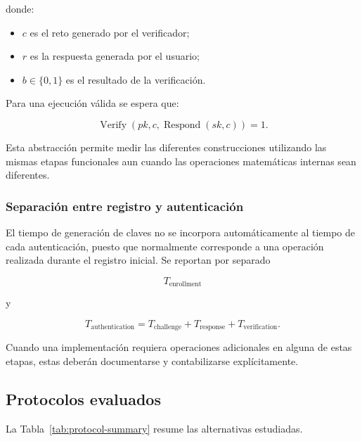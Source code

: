 donde:

\begin{itemize}
    \item $c$ es el reto generado por el verificador;
    \item $r$ es la respuesta generada por el usuario;
    \item $b \in \{0,1\}$ es el resultado de la verificación.
\end{itemize}

Para una ejecución válida se espera que:

\begin{equation}
    \operatorname{Verify}(pk,c,
    \operatorname{Respond}(sk,c)) = 1.
\end{equation}

Esta abstracción permite medir las diferentes construcciones utilizando las mismas
etapas funcionales aun cuando las operaciones matemáticas internas sean diferentes.

\subsubsection{Separación entre registro y autenticación}

El tiempo de generación de claves no se incorpora automáticamente al tiempo de cada
autenticación, puesto que normalmente corresponde a una operación realizada durante
el registro inicial. Se reportan por separado


\begin{equation}
    T_{\text{enrollment}}
\end{equation}

y

\begin{equation}
    T_{\text{authentication}}
    =
    T_{\text{challenge}}
    +
    T_{\text{response}}
    +
    T_{\text{verification}}.
\end{equation}

Cuando una implementación requiera operaciones adicionales en alguna de estas etapas,
estas deberán documentarse y contabilizarse explícitamente.


\subsection{Protocolos evaluados}
\label{sec:benchmark-protocols}

La Tabla~\ref{tab:protocol-summary} resume las alternativas estudiadas.

